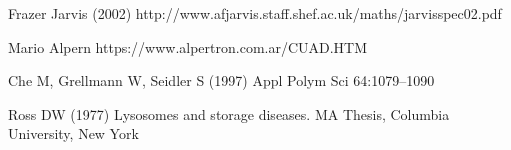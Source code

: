 %
%

%
% 
% 
%
\begin{thebibliography}{99.}

 Frazer Jarvis (2002)
http://www.afjarvis.staff.shef.ac.uk/maths/jarvisspec02.pdf

 Mario Alpern
https://www.alpertron.com.ar/CUAD.HTM

 Che M, Grellmann W, Seidler S (1997)
Appl Polym Sci 64:1079--1090

 Ross DW (1977) Lysosomes and storage diseases. MA
Thesis, Columbia University, New York

\end{thebibliography}
